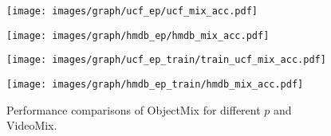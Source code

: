 \begin{figure}[t]
    \centering
    
    \begin{minipage}[t]{0.49\linewidth}
    \centering
    \texttt{[image: images/graph/ucf\_ep/ucf\_mix\_acc.pdf]}
    \end{minipage}
    \hfil
    \begin{minipage}[t]{0.49\linewidth}
    \centering
    \texttt{[image: images/graph/hmdb\_ep/hmdb\_mix\_acc.pdf]}
    \end{minipage}


    \begin{minipage}[t]{0.49\linewidth}
    \centering
    \texttt{[image: images/graph/ucf\_ep\_train/train\_ucf\_mix\_acc.pdf]}
    \label{fig:ucf_mix_acc_t}
    \end{minipage}
    \hfill
    \begin{minipage}[t]{0.49\linewidth}
    \centering
    \texttt{[image: images/graph/hmdb\_ep\_train/hmdb\_mix\_acc.pdf]}
    \label{fig:hmdb_mix_acc_t}
    \end{minipage}




    \caption{
    Performance comparisons of ObjectMix for different $p$ and VideoMix.
    }
    \label{fig:ObjectMix+or+mix_graph}
\end{figure}











